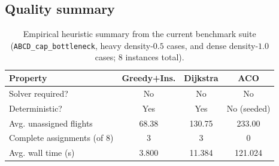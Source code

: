 \subsection{Quality summary}

\begin{table}[t]
\centering\small
\caption{Empirical heuristic summary from the current benchmark suite
  (\texttt{ABCD\_cap\_bottleneck}, heavy density-$0.5$ cases,
  and dense density-$1.0$ cases; 8 instances total).}
\label{tab:heuristic_comparison}
\begin{tabular}{lccc}
\toprule
Property & Greedy+Ins. & Dijkstra & ACO \\
\midrule
Solver required? & No  & No  & No \\
Deterministic?   & Yes & Yes & No (seeded) \\
Avg. unassigned flights & 68.38 & 130.75 & 233.00 \\
Complete assignments (of 8) & 3 & 3 & 0 \\
Avg. wall time (s) & 3.800 & 11.384 & 121.024 \\
\bottomrule
\end{tabular}
\end{table}
